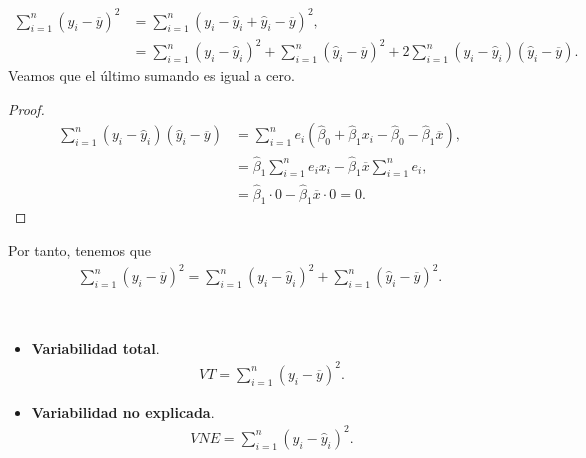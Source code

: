 \begin{enumerate}
\begin{align*}
              \sum_{i=1}^{n} (y_i - \overline{y})^2 & = \sum_{i=1}^{n} (y_i - \widehat{y}_i + \widehat{y}_i - \overline{y})^2,                                                                                           \\
                                                    & = \sum_{i=1}^{n} (y_i - \widehat{y}_i)^2 + \sum_{i=1}^{n} (\widehat{y}_i - \overline{y})^2 + 2 \sum_{i=1}^{n} (y_i - \widehat{y}_i)(\widehat{y}_i - \overline{y}).
          \end{align*}
          Veamos que el último sumando es igual a cero.
          \begin{proof}
              \begin{align*}
                  \sum_{i=1}^{n} (y_i - \widehat{y}_i)(\widehat{y}_i - \overline{y}) & = \sum_{i=1}^{n} e_i\left( \widehat{\beta}_0 + \widehat{\beta}_1 x_i - \widehat{\beta}_0 - \widehat{\beta}_1 \overline{x} \right), \\
                                                                                     & = \widehat{\beta}_1 \sum_{i=1}^{n} e_ix_i - \widehat{\beta}_1 \overline{x} \sum_{i=1}^{n} e_i,                                     \\
                                                                                     & = \widehat{\beta}_1 \cdot 0 - \widehat{\beta}_1 \overline{x} \cdot 0 = 0.
              \end{align*}
          \end{proof}
          Por tanto, tenemos que
          \begin{align*}
              \boxed{
                  \sum_{i=1}^{n} (y_i - \overline{y})^2 = \sum_{i=1}^{n} (y_i - \widehat{y}_i)^2 + \sum_{i=1}^{n} (\widehat{y}_i - \overline{y})^2.
              }
          \end{align*}
          \begin{defi} \
              \begin{itemize}
                  \item \textbf{Variabilidad total}.
                        \begin{align*}
                            VT = \sum_{i=1}^{n} (y_i - \overline{y})^2.
                        \end{align*}
                  \item \textbf{Variabilidad no explicada}.
                        \begin{align*}
                            VNE = \sum_{i=1}^{n} (y_i - \widehat{y}_i)^2.
                        \end{align*}

\end{itemize}
\end{defi}
\end{enumerate}
